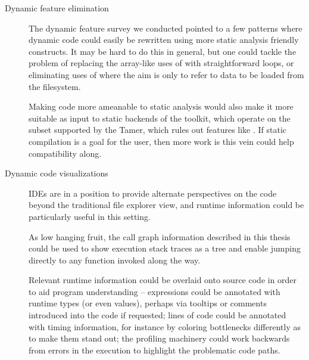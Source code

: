 \begin{description}

\item[Dynamic feature elimination] The dynamic feature survey we conducted
pointed to a few patterns where dynamic code could easily be rewritten using
more static analysis friendly constructs. It may be hard to do this in
general, but one could tackle the problem of replacing the array-like uses of
 with straightforward loops, or eliminating uses of 
where the aim is only to refer to data to be loaded from the filesystem.

Making code more ameanable to static analysis would also make it more suitable
as input to static backends of the \mclab toolkit, which operate on the \matlab
subset supported by the \matlab Tamer, which rules out features like
. If static compilation is a goal for the user, then more work is
this vein could help compatibility along.

\item[Dynamic code visualizations] IDEs are in a position to provide alternate
perspectives on the code beyond the traditional file explorer view, and runtime
information could be particularly useful in this setting.

As low hanging fruit, the call graph information described in this thesis could
be used to show execution stack traces as a tree and enable jumping directly to
any function invoked along the way.

Relevant runtime information could be overlaid onto source code in order to aid
program understanding -- expressions could be annotated with runtime types (or
even values), perhaps via tooltips or comments introduced into the code if
requested; lines of code could be annotated with timing information, for
instance by coloring bottlenecks differently as to make them stand out; the
profiling machinery could work backwards from errors in the execution to
highlight the problematic code paths.

\end{description}
